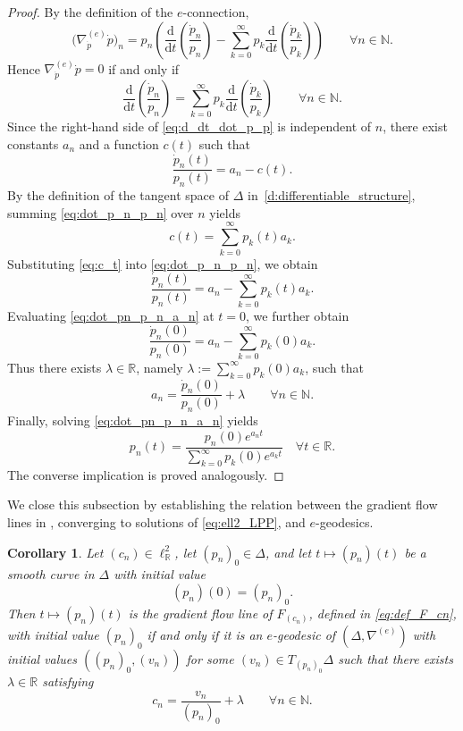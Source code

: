 \documentclass[12pt]{amsart}
\newtheorem{corollary}[corollary]{Corollary}
\numberwithin{figure}{section}
\numberwithin{table}{section}
\numberwithin{equation}{section}
\def\NN{\mathbb{N}}
\def\RR{\mathbb{R}}
\begin{document}
\begin{proof}
By the definition of the \(e\)-connection,
\[
\bigl(\nabla^{(e)}_{\dot p}\dot p\bigr)_n
=
p_n
\left(
\frac{\mathrm d}{\mathrm dt}\left(\frac{\dot p_n}{p_n}\right)
-
\sum_{k=0}^{\infty} p_k\frac{\mathrm d}{\mathrm dt}\left(\frac{\dot p_k}{p_k}\right)
\right)
\qquad \forall n\in \mathbb{N}.
\]
Hence \(\nabla^{(e)}_{\dot p}\dot p=0\) if and only if
\begin{equation}\label{eq:d_dt_dot_p_p}
\frac{\mathrm d}{\mathrm dt}\left(\frac{\dot p_n}{p_n}\right)
=
\sum_{k=0}^{\infty} p_k\frac{\mathrm d}{\mathrm dt}\left(\frac{\dot p_k}{p_k}\right)
\qquad \forall n\in\mathbb{N}.
\end{equation}
Since the right-hand side of \eqref{eq:d_dt_dot_p_p} is independent of \(n\), there exist constants \(a_n\) and a function \(c(t)\) such that
\begin{equation}\label{eq:dot_p_n_p_n}
\frac{\dot p_n(t)}{p_n(t)}=a_n-c(t).
\end{equation}
By the definition of the tangent space of \(\Delta\) in~\eqref{d:differentiable_structure}, summing \eqref{eq:dot_p_n_p_n} over \(n\) yields
\begin{equation}\label{eq:c_t}
c(t)=\sum_{k=0}^{\infty}p_k(t)a_k.
\end{equation}
Substituting \eqref{eq:c_t} into \eqref{eq:dot_p_n_p_n}, we obtain
\begin{equation}\label{eq:dot_pn_p_n_a_n}
\frac{\dot p_n(t)}{p_n(t)}
=
a_n-\sum_{k=0}^{\infty}p_k(t)a_k.
\end{equation}
Evaluating \eqref{eq:dot_pn_p_n_a_n} at \(t=0\), we further obtain
\[
\frac{\dot p_n(0)}{p_n(0)}
=
a_n-\sum_{k=0}^{\infty}p_k(0)a_k.
\]
Thus there exists \(\lambda\in\mathbb{R}\), namely \(\lambda:=\sum_{k=0}^{\infty}p_k(0)a_k\), such that
\[
a_n=\frac{\dot p_n(0)}{p_n(0)}+\lambda
\qquad \forall n\in\mathbb{N}.
\]
Finally, solving \eqref{eq:dot_pn_p_n_a_n} yields
\[
p_n(t)
=
\frac{p_n(0)e^{a_nt}}
{\sum_{k=0}^{\infty}p_k(0)e^{a_kt}} \quad \forall t\in \RR.
\]
The converse implication is proved analogously.
\end{proof}

We close this subsection by establishing the relation between the gradient flow lines in , converging to solutions of \eqref{eq:ell2_LPP}, and \(e\)-geodesics.

\begin{corollary}
Let \((c_n)\in \ell^2_\RR\), let \((p_n)_0\in \Delta\), and let \(t\mapsto (p_n)(t)\) be a smooth curve in \(\Delta\) with initial value
\[
(p_n)(0)=(p_n)_0.
\]
Then \(t\mapsto (p_n)(t)\) is the gradient flow line of \(F_{(c_n)}\), defined in \eqref{eq:def_F_cn}, with initial value \((p_n)_0\) if and only if it is an \(e\)-geodesic of \((\Delta,\nabla^{(e)})\) with initial values \(((p_n)_0,(v_n))\) for some \((v_n)\in T_{(p_n)_0}\Delta\) such that there exists \(\lambda\in \RR\) satisfying
\[
c_n = \frac{v_n}{(p_n)_0} + \lambda
\qquad \forall n\in \NN.
\]
\end{corollary}
\end{document}
